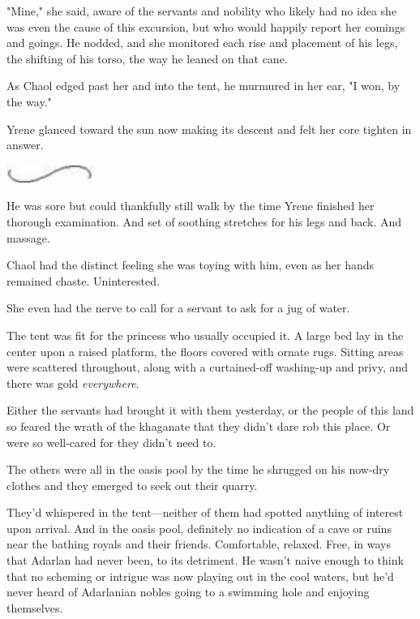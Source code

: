 "Mine," she said, aware of the servants and nobility who likely had no idea she was even the cause of this excursion, but who would happily report her comings and goings.
He nodded, and she monitored each rise and placement of his legs, the shifting of his torso, the way he leaned on that cane.

As Chaol edged past her and into the tent, he murmured in her ear, "I won, by the way."

Yrene glanced toward the sun now making its descent and felt her core tighten in answer.

\begin{center}
	\includegraphics[width=1.12in,height=0.24in]{images/seperator}
\end{center}

He was sore but could thankfully still walk by the time Yrene finished her thorough examination.
And set of soothing stretches for his legs and back.
And massage.

Chaol had the distinct feeling she was toying with him, even as her hands remained chaste.
Uninterested.

She even had the nerve to call for a servant to ask for a jug of water.

The tent was fit for the princess who usually occupied it.
A large bed lay in the center upon a raised platform, the floors covered with ornate rugs.
Sitting areas were scattered throughout, along with a curtained-off washing-up and privy, and there was gold \emph{everywhere}.

Either the servants had brought it with them yesterday, or the people of this land so feared the wrath of the khaganate that they didn't dare rob this place.
Or were so well-cared for they didn't need to.

The others were all in the oasis pool by the time he shrugged on his now-dry clothes and they emerged to seek out their quarry.

They'd whispered in the tent---neither of them had spotted anything of interest upon arrival.
And in the oasis pool, definitely no indication of a cave or ruins near the bathing royals and their friends.
Comfortable, relaxed.
Free, in ways that Adarlan had never been, to its detriment.
He wasn't naive enough to think that no scheming or intrigue was now playing out in the cool waters, but he'd never heard of Adarlanian nobles going to a swimming hole and enjoying themselves.

